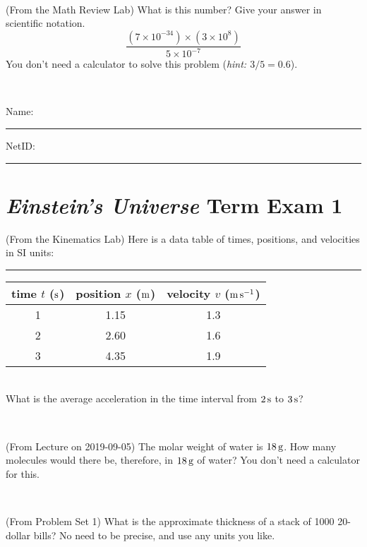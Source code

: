 \documentclass[12pt, letterpaper]{article}
\begin{document}
\vfill ~

\begin{problem} (From the Math Review Lab)
What is this number? Give your answer in scientific notation.
$$
\frac{(7\times10^{-34})\times(3\times10^8)}{5\times10^{-7}}
$$
You don't need a calculator to solve this problem (\textit{hint: $3/5=0.6$}).
\end{problem}


\vfill ~


\cleardoublepage



\noindent
Name: \rule[-1ex]{0.60\textwidth}{0.1pt}
NetID: \rule[-1ex]{0.20\textwidth}{0.1pt}

\section*{\textsl{Einstein's Universe} Term Exam 1}
\setcounter{problem}{1}


\begin{problem} (From the Kinematics Lab)
Here is a data table of times, positions, and velocities in SI units:\\
\rule{1.0in}{0pt}\begin{tabular}{c|c|c}
time $t$ ($\mathrm{s}$) & position $x$ ($\mathrm{m}$) & velocity $v$ ($\mathrm{m}\,\mathrm{s}^{-1}$) \\
\hline
1 & 1.15 & 1.3 \\
2 & 2.60 & 1.6 \\
3 & 4.35 & 1.9 \\
\hline
\end{tabular}\\
What is the average acceleration in the time interval from $2\,\mathrm{s}$ to $3\,\mathrm{s}$?
\end{problem}


\vfill ~

\begin{problem} (From Lecture on 2019-09-05)
The molar weight of water is $18\,\mathrm{g}$. How many molecules would there
be, therefore, in $18\,\mathrm{g}$ of water? You don't need a calculator for
this.
\end{problem}


\vfill ~

\begin{problem} (From Problem Set 1)
What is the approximate thickness of a stack of 1000 20-dollar bills?
No need to be precise, and use any units you like.
\end{problem}


\vfill ~
\end{document}
